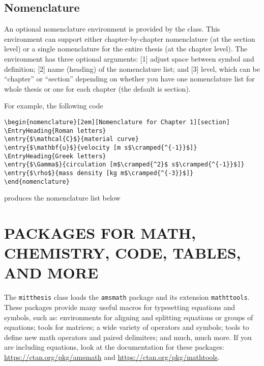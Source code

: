 \documentclass[11pt]{article}
\begin{document}
\subsection{Nomenclature}
An optional nomenclature environment is provided by the class.  This environment can support either chapter-by-chapter nomenclature (at the section level) or a single nomenclature for the entire thesis (at the chapter level). The environment has three optional arguments: [1] adjust space between symbol and definition; [2] name (heading) of the nomenclature list; and [3] level, which can be ``chapter'' or ``section'' depending on whether you
have one nomenclature list for whole thesis or one for each chapter (the default is section). 

For example, the following code 
\begin{center}
\begin{minipage}{0.85\textwidth}
\begin{verbatim}
\begin{nomenclature}[2em][Nomenclature for Chapter 1][section]
\EntryHeading{Roman letters}
\entry{$\mathcal{C}$}{material curve}
\entry{$\mathbf{u}$}{velocity [m s$\cramped{^{-1}}$]}
\EntryHeading{Greek letters}
\entry{$\Gamma$}{circulation [m$\cramped{^2}$ s$\cramped{^{-1}}$]}
\entry{$\rho$}{mass density [kg m$\cramped{^{-3}}$]}
\end{nomenclature}
\end{verbatim}
\end{minipage}
\end{center}
produces the nomenclature list below
\begin{center}
\begin{minipage}{0.8\textwidth}
\begin{nomenclature}
\end{nomenclature}
\end{minipage}
\end{center}

\section{PACKAGES FOR MATH, CHEMISTRY, CODE, TABLES, AND MORE}
The \texttt{mitthesis} class loads the \texttt{amsmath} package and its extension \texttt{mathttools}. These packages provide many useful macros for typesetting equations and symbols, such as: environments for aligning and splitting equations or groups of equations; tools for matrices; a wide variety of operators and symbols; tools to define new math operators and paired delimiters; and much, much more. If you are including equations, look at the documentation for these packages: \url{https://ctan.org/pkg/amsmath} and \url{https://ctan.org/pkg/mathtools}.
\end{document}

